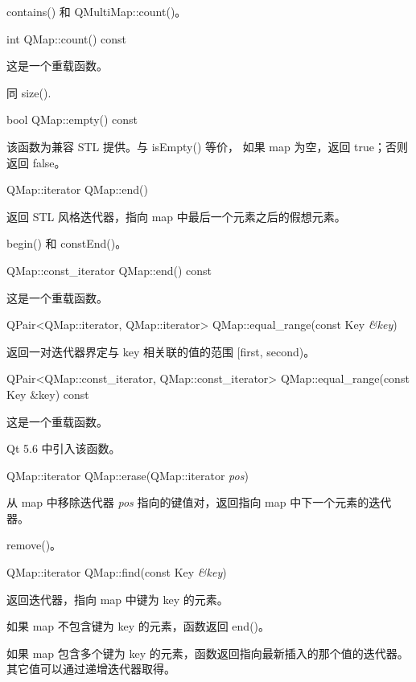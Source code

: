 \begin{seeAlso}
contains() 和 QMultiMap::count()。
\end{seeAlso}

\splitLine

int QMap::count() const

这是一个重载函数。

同 size().

\splitLine

bool QMap::empty() const

该函数为兼容 STL 提供。与 isEmpty() 等价，
如果 map 为空，返回 true；否则返回 false。

\splitLine

QMap::iterator QMap::end()

返回 STL 风格迭代器，指向 map 中最后一个元素之后的假想元素。

\begin{seeAlso}
begin() 和 constEnd()。
\end{seeAlso}

\splitLine

QMap::const\_iterator QMap::end() const

这是一个重载函数。

\splitLine

QPair<QMap::iterator, QMap::iterator> QMap::equal\_range(const Key \emph{\&key})

返回一对迭代器界定与 key 相关联的值的范围 [first, second)。

\splitLine

QPair<QMap::const\_iterator, QMap::const\_iterator> QMap::equal\_range(const Key \&key) const

这是一个重载函数。

Qt 5.6 中引入该函数。

\splitLine

QMap::iterator QMap::erase(QMap::iterator \emph{pos})

从 map 中移除迭代器 \emph{pos} 指向的键值对，返回指向 map 中下一个元素的迭代器。


\begin{seeAlso}
remove()。
\end{seeAlso}

\splitLine

QMap::iterator QMap::find(const Key \emph{\&key})

返回迭代器，指向 map 中键为 key 的元素。

如果 map 不包含键为 key 的元素，函数返回 end()。

如果 map 包含多个键为 key 的元素，函数返回指向最新插入的那个值的迭代器。
其它值可以通过递增迭代器取得。

